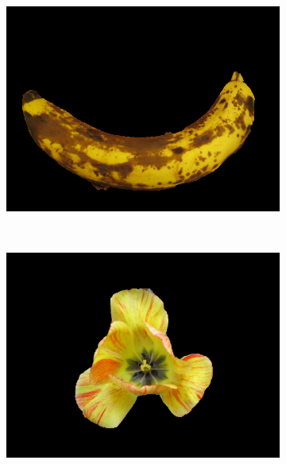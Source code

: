 \documentclass[10pt,twocolumn,letterpaper]{article}
\begin{document}
\begin{figure}[t]
        \begin{subfigure}[b]{0.15\textwidth}
                \includegraphics[width=\textwidth]{figures/segmentations/banana2.png}
        \end{subfigure}%
        ~
        \begin{subfigure}[b]{0.15\textwidth}
                \includegraphics[width=\textwidth]{figures/segmentations/flower.png}
        \end{subfigure}%
        ~
        \begin{subfigure}[b]{0.15\textwidth}

\end{subfigure}
\end{figure}
\end{document}
